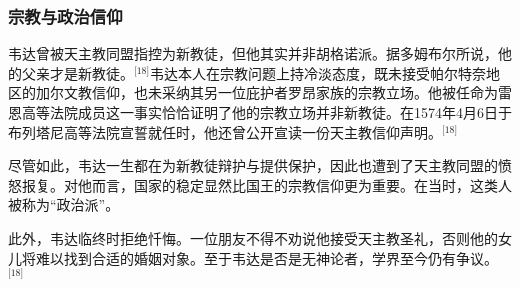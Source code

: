 \subsubsection{宗教与政治信仰}
韦达曾被天主教同盟指控为新教徒，但他其实并非胡格诺派。据多姆布尔所说，他的父亲才是新教徒。\(^\text{[18]}\)韦达本人在宗教问题上持冷淡态度，既未接受帕尔特奈地区的加尔文教信仰，也未采纳其另一位庇护者罗昂家族的宗教立场。他被任命为雷恩高等法院成员这一事实恰恰证明了他的宗教立场并非新教徒。在1574年4月6日于布列塔尼高等法院宣誓就任时，他还曾公开宣读一份天主教信仰声明。\(^\text{[18]}\)

尽管如此，韦达一生都在为新教徒辩护与提供保护，因此也遭到了天主教同盟的愤怒报复。对他而言，国家的稳定显然比国王的宗教信仰更为重要。在当时，这类人被称为“政治派”。

此外，韦达临终时拒绝忏悔。一位朋友不得不劝说他接受天主教圣礼，否则他的女儿将难以找到合适的婚姻对象。至于韦达是否是无神论者，学界至今仍有争议。\(^\text{[18]}\)
